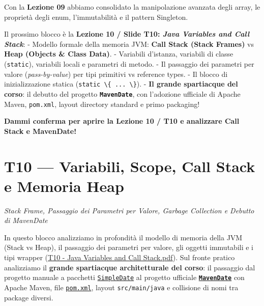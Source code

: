 \documentclass[11pt,a4paper,oneside]{report}
\newcommand{\passthrough}[1]{#1}
\begin{document}
\begin{studynote} Con la \textbf{Lezione 09} abbiamo consolidato la
manipolazione avanzata degli array, le proprietà degli enum,
l'immutabilità e il pattern Singleton.

Il prossimo blocco è la \textbf{Lezione 10 / Slide T10: \emph{Java
Variables and Call Stack}}: - Modello formale della memoria JVM:
\textbf{Call Stack (Stack Frames)} vs \textbf{Heap (Objects \& Class
Data)}. - Variabili d'istanza, variabili di classe
(\passthrough{\lstinline!static!}), variabili locali e parametri di
metodo. - Il passaggio dei parametri per valore (\emph{pass-by-value})
per tipi primitivi vs reference types. - Il blocco di inizializzazione
statica (\passthrough{\lstinline!static \{ ... \}!}). - \textbf{Il
grande spartiacque del corso}: il debutto del progetto
\textbf{\passthrough{\lstinline!MavenDate!}}, con l'adozione ufficiale
di Apache Maven, \passthrough{\lstinline!pom.xml!}, layout directory
standard e primo packaging!
\end{studynote}

\textbf{Dammi conferma per aprire la Lezione 10 / T10 e analizzare Call
Stack e MavenDate!}

\newpage
\chapter[T10 --- Variabili, Scope, Call Stack e Memo]{T10 --- Variabili, Scope, Call Stack e Memoria Heap}
\label{chap:t10}

{\small\sffamily\color{accentblue!80!black}\textit{Stack Frame, Passaggio dei Parametri per Valore, Garbage Collection e Debutto di MavenDate}}

\vspace{0.8em}

In questo blocco analizziamo in profondità il modello di memoria della
JVM (Stack vs Heap), il passaggio dei parametri per valore, gli oggetti
immutabili e i tipi wrapper
(\href{file:///home/wally/Documenti/GitHub/Programmazione-II/25-26/Teoria-e-Esercitazioni/Slides-20260902/T10\%20-\%20Java\%20Variables\%20and\%20Call\%20Stack.pdf}{T10
- Java Variables and Call Stack.pdf}). Sul fronte pratico analizziamo il
\textbf{grande spartiacque architetturale del corso}: il passaggio dal
progetto manuale a pacchetti
\href{file:///home/wally/Documenti/GitHub/Programmazione-II/25-26/Teoria-e-Esercitazioni/Codice-20260902/Lezione10/SimpleDate}{\passthrough{\lstinline!SimpleDate!}}
al progetto ufficiale
\textbf{\href{file:///home/wally/Documenti/GitHub/Programmazione-II/25-26/Teoria-e-Esercitazioni/Codice-20260902/Lezione10/MavenDate}{\passthrough{\lstinline!MavenDate!}}}
con Apache Maven, file
\href{file:///home/wally/Documenti/GitHub/Programmazione-II/25-26/Teoria-e-Esercitazioni/Codice-20260902/Lezione10/MavenDate/pom.xml}{\passthrough{\lstinline!pom.xml!}},
layout \passthrough{\lstinline!src/main/java!} e collisione di nomi tra
package diversi.
\end{document}
